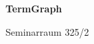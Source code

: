 \documentclass[a4paper]{article}
\begin{document}
\printGenericVSLHeader
\begin{center}
\begin{vsltext}{3cm}{4cm}

   \vspace{0.5cm} 

    \textbf{TermGraph} 

    \vspace{1.5cm}

    Seminarraum 325/2

\end{vsltext}

\end{center}
\end{document}
